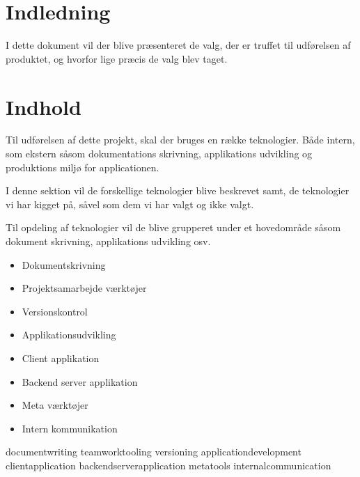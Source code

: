 \chapter{Indledning}

I dette dokument vil der blive præsenteret de valg, der er truffet til udførelsen af produktet, og hvorfor lige præcis de valg blev taget.

\chapter{Indhold}

Til udførelsen af dette projekt, skal der bruges en række teknologier. Både intern, som ekstern såsom dokumentations skrivning, applikations udvikling og produktions miljø for applicationen.

I denne sektion vil de forskellige teknologier blive beskrevet samt, de teknologier vi har kigget på, såvel som dem vi har valgt og ikke valgt.

Til opdeling af teknologier vil de blive grupperet under et hovedområde såsom dokument skrivning, applikations udvikling osv.

\begin{itemize}
    \item Dokumentskrivning
    \item Projektsamarbejde værktøjer
    \item Versionskontrol
    \item Applikationsudvikling
    \item Client applikation
    \item Backend server applikation
    \item Meta værktøjer
    \item Intern kommunikation
\end{itemize}

{documentwriting} \newpage
{teamworktooling}  \newpage
{versioning} \newpage
{applicationdevelopment} \newpage
{clientapplication} \newpage
{backendserverapplication} \newpage
{metatools} \newpage
{internalcommunication} \newpage

